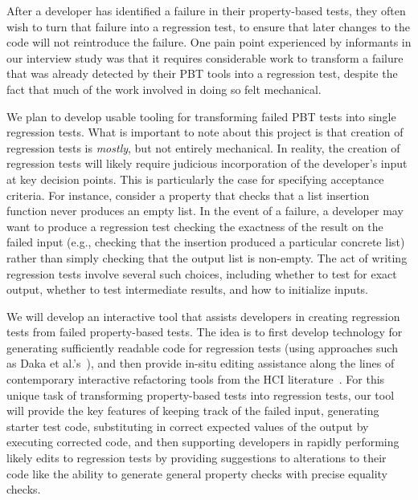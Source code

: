 After a developer has identified a failure in their property-based tests, they
often wish to turn that failure into a regression test, to ensure that later
changes to the code will not reintroduce the failure. One pain point experienced
by informants in our interview study was that it requires considerable work to
transform a failure that was already detected by their PBT tools into a
regression test, despite the fact that much of the work involved in doing so
felt mechanical.

We plan to develop usable tooling for transforming failed PBT tests into single
regression tests. What is important to note about this project is that creation
of regression tests is \emph{mostly}, but not entirely mechanical. In reality,
the creation of regression tests will likely require judicious incorporation of
the developer's input at key decision points. This is particularly the case for
specifying acceptance criteria. For instance, consider a property that checks
that a list insertion function never produces an empty list. In the event of a
failure, a developer may want to produce a regression test checking the
exactness of the result on the failed input (e.g., checking that the insertion
produced a particular concrete list) rather than simply checking that the output
list is non-empty. The act of writing regression tests involve several such
choices, including whether to test for exact output, whether to test
intermediate results, and how to initialize inputs.

We will develop an interactive tool that assists developers in creating
regression tests from failed property-based tests. The idea is to first develop
technology for generating sufficiently readable code for regression tests (using
approaches such as Daka et al.'s~\cite{ref:daka2015modeling}), and then provide
in-situ editing assistance along the lines of contemporary interactive
refactoring tools from the HCI
literature~\cite{ref:head2018interactive,ref:barik2016quick,ref:murphyhill2008refactoring,ref:lee2013draganddrop}.
For this unique task of transforming property-based tests into regression tests,
our tool will provide the key features of keeping track of the failed input,
generating starter test code, substituting in correct expected values of the
output by executing corrected code, and then supporting developers in rapidly
performing likely edits to regression tests by providing suggestions to
alterations to their code like the ability to generate general property checks
with precise equality checks.

